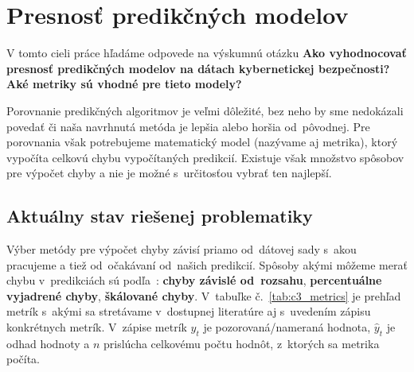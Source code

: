 \documentclass[thesismargins, thesislinespacing, openright, upjsfrontpage]{rnthesis}
\begin{document}
\section{Presnosť predikčných modelov}
V tomto cieli práce hľadáme odpovede na výskumnú otázku \textbf{Ako vyhodnocovať presnosť predikčných modelov na dátach kybernetickej bezpečnosti? Aké metriky sú vhodné pre tieto modely?}

Porovnanie predikčných algoritmov je veľmi dôležité, bez neho by sme nedokázali povedať či naša navrhnutá metóda je lepšia alebo horšia od~pôvodnej. Pre porovnania však potrebujeme matematický model (nazývame aj metrika), ktorý vypočíta celkovú chybu vypočítaných predikcií. Existuje však množstvo spôsobov pre výpočet chyby a nie je možné s~určitosťou vybrať ten najlepší. 

\subsection{Aktuálny stav riešenej problematiky}

Výber metódy pre výpočet chyby závisí priamo od~dátovej sady s~akou pracujeme a tiež od~očakávaní od~našich predikcií. Spôsoby akými môžeme merať chybu v~predikciách sú podľa~\cite{hyndman2018forecasting}:  \textbf{chyby závislé od~rozsahu}, \textbf{percentuálne vyjadrené chyby},  \textbf{škálované chyby}. V~tabuľke č.~\ref{tab:c3_metrics} je prehľad metrík s~akými sa stretávame v~dostupnej literatúre aj s~uvedením zápisu konkrétnych metrík. V~zápise metrík $y_t$ je pozorovaná/nameraná hodnota, $\hat{y}_{t}$ je odhad hodnoty a $n$ prislúcha celkovému počtu hodnôt, z~ktorých sa metrika počíta.
\end{document}
